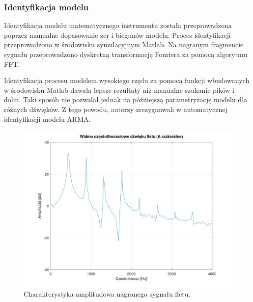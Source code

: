 \subsubsection{Identyfikacja modelu}
Identyfikacja modelu matematycznego instrumentu została przeprowadzona poprzez manualne dopasowanie zer i biegunów modelu.
Proces identyfikacji przeprowadzono w środowisku symulacyjnym Matlab. Na nagranym fragmencie sygnału przeprowadzono dyskretną transformację Fouriera za pomocą algorytmu FFT.

Identyfikacja procesu modelem wysokiego rzędu za pomocą funkcji wbudowanych w środowisku Matlab dawała lepsze rezultaty niż manualne szukanie pików i dolin. Taki sposób nie pozwalał jednak na późniejszą parametryzację modelu dla różnych dźwięków. Z tego powodu, autorzy zrezygnowali w automatycznej identyfikacji modelu ARMA.

\begin{figure}[H]
	\centering
	\includegraphics[width=12cm]{grafiki/flute_spectrum_orig}
	\captionsetup{justification=centering}
	\caption{Charakterystyka amplitudowa nagranego sygnału fletu.}
	\label{rys:flute_spectrum}
\end{figure}

